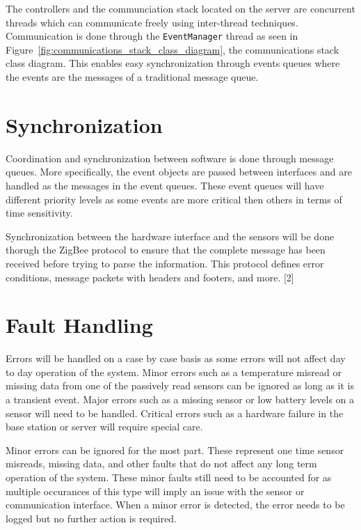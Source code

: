 \documentclass{report}
\begin{document}
The controllers and the communciation stack located on the server are
concurrent threads which can communicate freely using inter-thread techniques.
Communication is done through the \texttt{EventManager} thread as seen in
Figure~\ref{fig:communications_stack_class_diagram}, the communications stack
class diagram. This enables easy synchronization through events queues where
the events are the messages of a traditional message queue.

\section{Synchronization}

Coordination and synchronization between software is done through message
queues. More specifically, the event objects are passed between interfaces and
are handled as the messages in the event queues. These event queues will
have different priority levels as some events are more critical then others in
terms of time sensitivity. 

Synchronization between the hardware interface and the sensors will be done
thorugh the ZigBee protocol to ensure that the complete message has been
received before trying to parse the information. This protocol defines error
conditions, message packets with headers and footers, and more. [2]


\section{Fault Handling}
Errors will be handled on a case by case basis as some errors will not affect
day to day operation of the system. Minor errors such as a temperature misread
or missing data from one of the passively read sensors can be ignored as long
as it is a transient event. Major errors such as a missing sensor or low
battery levels on a sensor will need to be handled. Critical errors such as a
hardware failure in the base station or server will require special care.

Minor errors can be ignored for the most part. These represent one time sensor
misreads, missing data, and other faults that do not affect any long term
operation of the system. These minor faults still need to be accounted for as
multiple occurances of this type will imply an issue with the sensor or
communication interface. When a minor error is detected, the error needs to be
logged but no further action is required.
\end{document}
